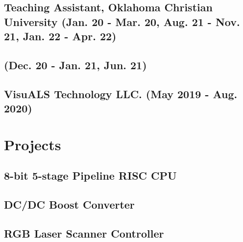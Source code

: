 \documentclass{article}
\begin{document}
	\subsection{Teaching Assistant, Oklahoma Christian University (Jan. 20 - Mar. 20, Aug. 21 - Nov. 21, Jan. 22 - Apr. 22)}
	\subsection{(Dec. 20 - Jan. 21, Jun. 21)}
	\subsection{VisuALS Technology LLC. (May 2019 - Aug. 2020)}

\section{Projects}
	\subsection{8-bit 5-stage Pipeline RISC CPU}
	\subsection{DC/DC Boost Converter}
	\subsection{RGB Laser Scanner Controller}
\end{document}
